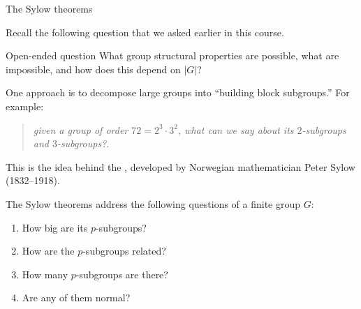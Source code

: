 \documentclass[8pt, handout]{beamer}
\newcommand{\Pause}{\pause}      %
\begin{document}
\begin{frame}{The Sylow theorems} %

  Recall the following question that we asked earlier in this
  course. \smallskip
  
  \begin{exampleblock}{Open-ended question}
    What group structural properties are possible, what are
    impossible, and how does this depend on $|G|$?
  \end{exampleblock}

  \smallskip\Pause
  
  One approach is to decompose large groups into ``building block
  subgroups.'' \Pause For example:
  
  \smallskip
  
  \begin{quote}
    \emph{given a group of order $72=2^3\cdot 3^2$, what can we say
      about its $2$-subgroups and $3$-subgroups?}.
  \end{quote}
    
  \smallskip\Pause

  This is the idea behind the , developed by
  Norwegian mathematician Peter Sylow (1832--1918). \medskip\Pause

  The Sylow theorems address the following questions of a finite group $G$:
  
  \smallskip\Pause
  
  \begin{enumerate}
    \item How big are its $p$-subgroups? \smallskip\Pause
    \item How are the $p$-subgroups related? \smallskip\Pause
    \item How many $p$-subgroups are there? \smallskip\Pause
    \item Are any of them normal? 
  \end{enumerate}
  
\end{frame}

\end{document}
